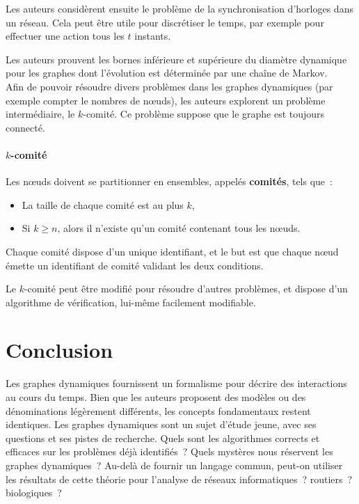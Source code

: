 \documentclass[12pt,a4paper]{article}
\begin{document}
Les auteurs considèrent ensuite le problème de la synchronisation
d'horloges dans un réseau. Cela peut être utile pour discrétiser le
temps, par exemple pour effectuer une action tous les \(t\) instants.

Les auteurs prouvent les bornes inférieure et supérieure du diamètre
dynamique pour les graphes dont l'évolution est déterminée
par une chaîne de Markov.\\

Afin de pouvoir résoudre divers problèmes dans les graphes dynamiques
(par exemple compter le nombres de nœuds), les auteurs explorent un
problème intermédiaire, le \(k\)-comité. Ce problème suppose que le
graphe est toujours connecté.

\paragraph{\(k\)-comité}
Les nœuds doivent se partitionner en ensembles, appelés
\textbf{comités}, tels que~:
\begin{itemize}
\item La taille de chaque comité est au plus \(k\),
\item Si \(k \geq n\), alors il n'existe qu'un comité contenant tous
  les nœuds.
\end{itemize}
Chaque comité dispose d'un unique identifiant, et le but est que
chaque nœud émette un identifiant de comité validant les deux
conditions.

Le \(k\)-comité peut être modifié pour résoudre d'autres problèmes, et
dispose d'un algorithme de vérification, lui-même facilement
modifiable.

\section{Conclusion}
Les graphes dynamiques fournissent un formalisme pour décrire des
interactions au cours du temps. Bien que les auteurs proposent des
modèles ou des dénominations légèrement différents, les concepts
fondamentaux restent identiques. Les graphes dynamiques sont un sujet
d'étude jeune, avec ses questions et ses pistes de recherche. Quels
sont les algorithmes corrects et efficaces sur les problèmes déjà
identifiés~? Quels mystères nous réservent les graphes dynamiques~?
Au-delà de fournir un langage commun, peut-on utiliser les résultats
de cette théorie pour l'analyse de réseaux informatiques~? routiers~?
biologiques~?

\pagebreak
\printbibliography{}
\end{document}
